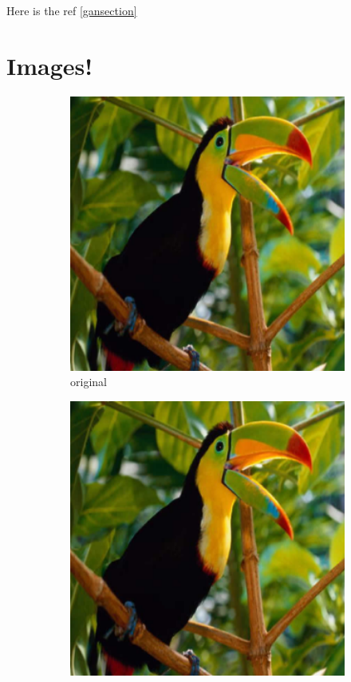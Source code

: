 \documentclass[12pt,onecolumn,oneside,titlepage]{article}
\begin{document}
Here is the ref \ref{gansection}



\section{Images!} \label{sec:exp}

\begin{figure}[H]
 \centering
  \begin{subfigure}{0.3\textwidth}
  \includegraphics[width=1\textwidth]{bird_HR} 
  \caption{original}
  \end{subfigure}
  \begin{subfigure}{0.3\textwidth}
  \includegraphics[width=1\textwidth]{bird_HR}

\end{subfigure}
\end{figure}
\end{document}
